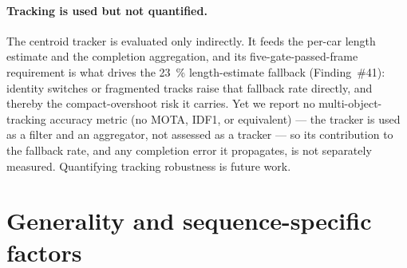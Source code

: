 \paragraph{Tracking is used but not quantified.}
The centroid tracker is evaluated only indirectly. It feeds the per-car length estimate
and the completion aggregation, and its five-gate-passed-frame requirement is what drives
the \SI{23}{\percent} length-estimate fallback (Finding~\#41): identity switches or
fragmented tracks raise that fallback rate directly, and thereby the compact-overshoot
risk it carries. Yet we report no multi-object-tracking accuracy metric (no MOTA, IDF1, or
equivalent) --- the tracker is used as a filter and an aggregator, not assessed as a
tracker --- so its contribution to the fallback rate, and any completion error it
propagates, is not separately measured. Quantifying tracking robustness is future work.

\section{Generality and sequence-specific factors}
\label{sec:disc-generalises}

